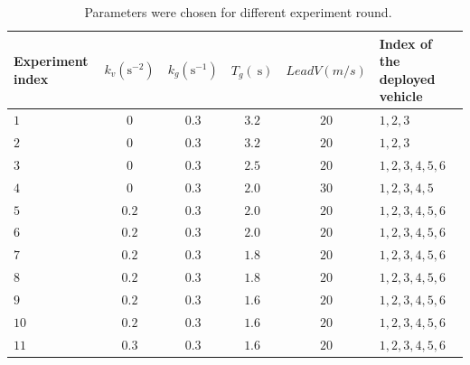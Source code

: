 \documentclass[a4paper]{cas-sc}
\begin{document}
\begin{table}
  \centering
  \setlength{\abovecaptionskip}{0pt}
  \setlength{\belowcaptionskip}{10pt}%
  \caption{~Parameters were chosen for different experiment round.}
  {\begin{tabular}{lccccl} \toprule
      Experiment index & $k_{v} (\mathrm{s}^{-2})$ & $k_{g} (\mathrm{s}^{-1})$ & $T_{g} (\mathrm{~s})$ & $LeadV (m/s)$ & Index of the deployed vehicle \\ \midrule
      $1 $             & $0$                       & $0.3 $                    & $3.2$                 & $20$          & $1,2,3$                       \\
      $2 $             & $0$                       & $0.3 $                    & $3.2$                 & $20$          & $1,2,3$                       \\
      $3 $             & $0$                       & $0.3 $                    & $2.5$                 & $20$          & $1,2,3,4,5,6$                 \\
      $4 $             & $0$                       & $0.3 $                    & $2.0$                 & $30$          & $1,2,3,4,5$                   \\
      $5 $             & $0.2$                     & $0.3 $                    & $2.0$                 & $20$          & $1,2,3,4,5,6$                 \\
      $6 $             & $0.2$                     & $0.3 $                    & $2.0$                 & $20$          & $1,2,3,4,5,6$                 \\
      $7 $             & $0.2$                     & $0.3 $                    & $1.8$                 & $20$          & $1,2,3,4,5,6$                 \\
      $8 $             & $0.2$                     & $0.3 $                    & $1.8$                 & $20$          & $1,2,3,4,5,6$                 \\
      $9 $             & $0.2$                     & $0.3 $                    & $1.6$                 & $20$          & $1,2,3,4,5,6$                 \\
      $10$             & $0.2$                     & $0.3 $                    & $1.6$                 & $20$          & $1,2,3,4,5,6$                 \\
      $11$             & $0.3$                     & $0.3 $                    & $1.6$                 & $20$          & $1,2,3,4,5,6$                 \\

\end{tabular}}
\end{table}
\end{document}
